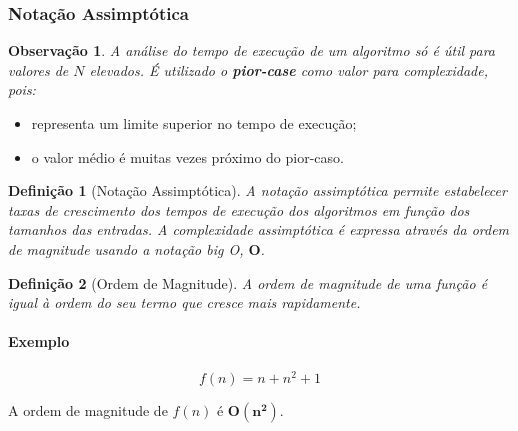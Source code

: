 \documentclass[a4paper, 12pt]{article}
\newtheorem{definition}{Definição}[section]
\newtheorem{remark}{Observação}
\begin{document}
\subsubsection{Notação Assimptótica}

\begin{remark}
    A análise do tempo de execução de um algoritmo só é útil para valores de $N$ elevados. É utilizado o \textbf{pior-case} como valor para complexidade, pois:\end{remark}

    \begin{itemize}
        \item representa um limite superior no tempo de execução;
        \item o valor médio é muitas vezes próximo do pior-caso.
    \end{itemize}

\begin{definition}[Notação Assimptótica]
    A notação assimptótica permite estabelecer taxas de crescimento dos tempos de execução dos algoritmos em função dos tamanhos das entradas. A complexidade assimptótica é expressa através da ordem de magnitude usando a notação \emph{big O}, $\mathbf{O}$.
\end{definition}

\begin{definition}[Ordem de Magnitude]
    A ordem de magnitude de uma função é igual à ordem do seu termo que cresce mais rapidamente.
\end{definition}

\paragraph{Exemplo}
    $$
        f(n)=n+n^2+1
    $$

    A ordem de magnitude de $f(n)$ é $\mathbf{O(n^2)}$.
\end{document}
